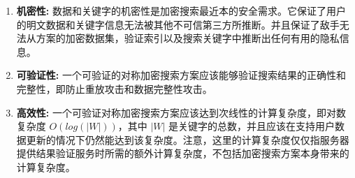 \begin{enumerate}
	\item \textbf{机密性:} 数据和关键字的机密性是加密搜索最近本的安全需求。它保证了用户的明文数据和关键字信息无法被其他不可信第三方所推断。并且保证了敌手无法从方案的加密数据集，验证索引以及搜索关键字中推断出任何有用的隐私信息。
	\item \textbf{可验证性:} 一个可验证的对称加密搜索方案应该能够验证搜索结果的正确性和完整性，即防止重放攻击和数据完整性攻击。%
	\item \textbf{高效性:} 一个可验证对称加密搜索方案应该达到次线性的计算复杂度，即对数复杂度 $O(log(|W|))$，其中 $|W|$ 是关键字的总数，并且应该在支持用户数据更新的情况下仍然能达到该复杂度。注意，这里的计算复杂度仅仅指服务器提供结果验证服务时所需的额外计算复杂度，不包括加密搜索方案本身带来的计算复杂度。%
\end{enumerate}



